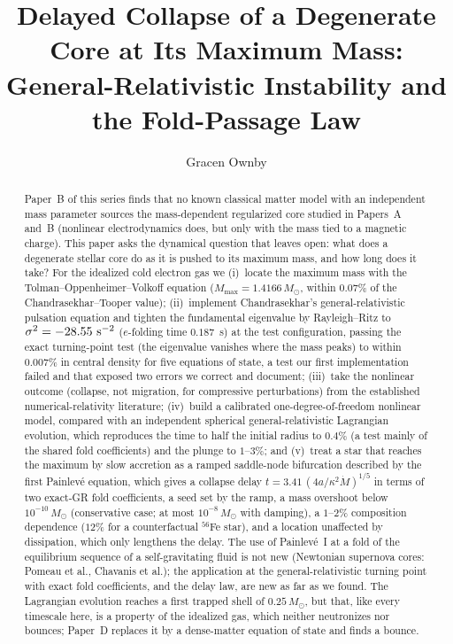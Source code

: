 \documentclass[11pt]{article}
\title{Delayed Collapse of a Degenerate Core at Its Maximum Mass:\\
General-Relativistic Instability and the Fold-Passage Law}
\author{Gracen Ownby}
\date{}
\begin{document}
\maketitle

\begin{abstract}
Paper~B of this series finds that no known classical matter model with an independent mass parameter sources the mass-dependent regularized core studied in Papers~A and~B (nonlinear electrodynamics does, but only with the mass tied to a magnetic charge). This paper asks the dynamical question that leaves open: what does a degenerate stellar core do as it is pushed to its maximum mass, and how long does it take? For the idealized cold electron gas we (i)~locate the maximum mass with the Tolman--Oppenheimer--Volkoff equation ($M_{\max}=1.4166\,M_\odot$, within $0.07\%$ of the Chandrasekhar--Tooper value); (ii)~implement Chandrasekhar's general-relativistic pulsation equation and tighten the fundamental eigenvalue by Rayleigh--Ritz to $\sigma^2=-28.55\ {\rm s}^{-2}$ ($e$-folding time $0.187$~s) at the test configuration, passing the exact turning-point test (the eigenvalue vanishes where the mass peaks) to within $0.007\%$ in central density for five equations of state, a test our first implementation failed and that exposed two errors we correct and document; (iii)~take the nonlinear outcome (collapse, not migration, for compressive perturbations) from the established numerical-relativity literature; (iv)~build a calibrated one-degree-of-freedom nonlinear model, compared with an independent spherical general-relativistic Lagrangian evolution, which reproduces the time to half the initial radius to $0.4\%$ (a test mainly of the shared fold coefficients) and the plunge to $1$--$3\%$; and (v)~treat a star that reaches the maximum by slow accretion as a ramped saddle-node bifurcation described by the first Painlev\'e equation, which gives a collapse delay $t=3.41\,(4a/\kappa^2\dot M)^{1/5}$ in terms of two exact-GR fold coefficients, a seed set by the ramp, a mass overshoot below $10^{-10}\,M_\odot$ (conservative case; at most $10^{-8}\,M_\odot$ with damping), a $1$--$2\%$ composition dependence ($12\%$ for a counterfactual $^{56}$Fe star), and a location unaffected by dissipation, which only lengthens the delay. The use of Painlev\'e~I at a fold of the equilibrium sequence of a self-gravitating fluid is not new (Newtonian supernova cores: Pomeau et al., Chavanis et al.); the application at the general-relativistic turning point with exact fold coefficients, and the delay law, are new as far as we found. The Lagrangian evolution reaches a first trapped shell of $0.25\,M_\odot$, but that, like every timescale here, is a property of the idealized gas, which neither neutronizes nor bounces; Paper~D replaces it by a dense-matter equation of state and finds a bounce.
\end{abstract}
\end{document}
